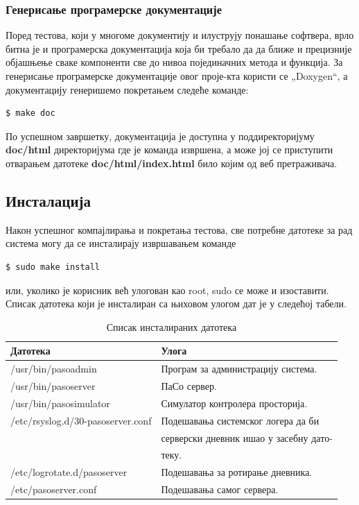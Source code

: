 \documentclass[a4paper, 12pt, diplomski]{etfcyr}
\def\quote#1{„#1“}
\begin{document}
				\subsubsection{Генерисање програмерске документације}
					\begin{justify}
						Поред тестова, који у многоме документију и илуструју понашање софтвера, врло битна је и програмерска документација која би требало да да ближе и прецизније објашњење сваке компоненти све до нивоа појединачних метода и функција. За генерисање програмерске документације овог проје-кта користи се \quote{Doxygen}, а документацију генеришемо покретањем следеће команде:
						\begin{footnotesize}
							\begin{verbatim}
$ make doc
							\end{verbatim}
						\end{footnotesize}
						По успешном завршетку, документација је доступна у поддиректоријуму \textbf{doc/html} директоријума где је команда извршена, а може јој се приступити отварањем датотеке \textbf{doc/html/index.html} било којим од веб претраживача.
					\end{justify}

			\subsection{Инсталација}
				\begin{justify}
					Након успешног компајлирања и покретања тестова, све потребне датотеке за рад система могу да се инсталирају извршавањем команде
					\begin{footnotesize}
						\begin{verbatim}
$ sudo make install
						\end{verbatim}
					\end{footnotesize}
					или, уколико је корисник већ улогован као root, sudo се може и изоставити. Списак датотека који је инсталиран са њиховом улогом дат је у следећој табели.
					\begin{table}[H]
						\begin{tabular}{l l}
							Датотека & Улога \\
							\hline
							/usr/bin/pasoadmin & Програм за администрацију система. \\
							/usr/bin/pasoserver & ПаСо сервер. \\
							/usr/bin/pasosimulator & Симулатор контролера просторија. \\
							/etc/rsyslog.d/30-pasoserver.conf & Подешавања системског логера да би \\
							&серверски дневник ишао у засебну дато- \\
							&теку. \\
							/etc/logrotate.d/pasoserver & Подешавања за ротирање дневника. \\
							/etc/pasoserver.conf & Подешавања самог сервера. \\
							\hline
						\end{tabular}
						\caption{Списак инсталираних датотека}
						\label{table:installed_files}
					\end{table}
				\end{justify}
\end{document}
